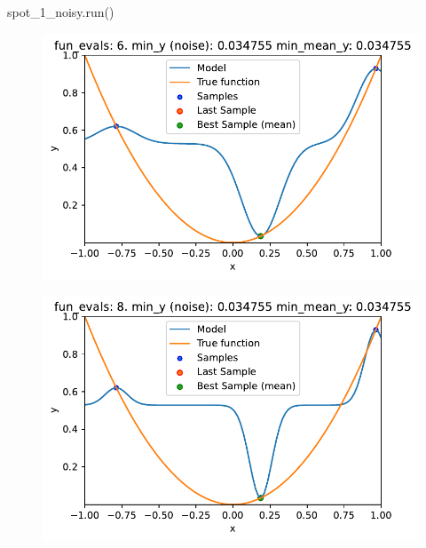 \documentclass[
  letterpaper,
  DIV=11,
  numbers=noendperiod]{scrreprt}
\newenvironment{Shaded}{\begin{snugshade}}{\end{snugshade}}
\newcommand{\NormalTok}[1]{\textcolor[rgb]{0.00,0.23,0.31}{#1}}
\begin{document}
\begin{Shaded}
\begin{Highlighting}[]
\NormalTok{spot\_1\_noisy.run()}
\end{Highlighting}
\end{Shaded}

\begin{figure}[H]

{\centering \includegraphics{013_num_spot_noisy_files/figure-pdf/cell-10-output-1.pdf}

}

\end{figure}

\begin{figure}[H]

{\centering \includegraphics{013_num_spot_noisy_files/figure-pdf/cell-10-output-2.pdf}

}

\end{figure}
\end{document}
